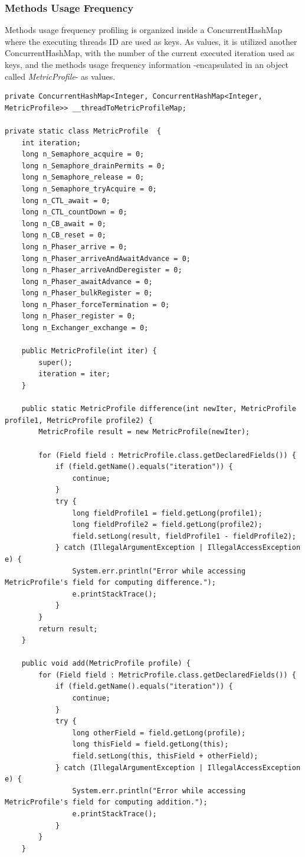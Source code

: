 \documentclass[]{usiinfthesis}
\begin{document}
\subsubsection{Methods Usage Frequency}
 Methods usage frequency profiling is organized inside a ConcurrentHashMap where the executing threads ID are used as keys. As values, it is utilized another ConcurrentHashMap, with the number of the current executed iteration used as keys, and the methods usage frequency information -encapsulated in an object called \textit{MetricProfile}- as values.
    \vspace*{0.25cm}
        \begin{verbatim}
private ConcurrentHashMap<Integer, ConcurrentHashMap<Integer, MetricProfile>> __threadToMetricProfileMap;

private static class MetricProfile  {
    int iteration;
    long n_Semaphore_acquire = 0;
    long n_Semaphore_drainPermits = 0;
    long n_Semaphore_release = 0;
    long n_Semaphore_tryAcquire = 0;
    long n_CTL_await = 0;
    long n_CTL_countDown = 0;
    long n_CB_await = 0;
    long n_CB_reset = 0;
    long n_Phaser_arrive = 0;
    long n_Phaser_arriveAndAwaitAdvance = 0;
    long n_Phaser_arriveAndDeregister = 0;
    long n_Phaser_awaitAdvance = 0;
    long n_Phaser_bulkRegister = 0;
    long n_Phaser_forceTermination = 0;
    long n_Phaser_register = 0;
    long n_Exchanger_exchange = 0;

    public MetricProfile(int iter) {
        super();
        iteration = iter;
    }

    public static MetricProfile difference(int newIter, MetricProfile profile1, MetricProfile profile2) {
        MetricProfile result = new MetricProfile(newIter);

        for (Field field : MetricProfile.class.getDeclaredFields()) {
            if (field.getName().equals("iteration")) {
                continue;
            }
            try {
                long fieldProfile1 = field.getLong(profile1);
                long fieldProfile2 = field.getLong(profile2);
                field.setLong(result, fieldProfile1 - fieldProfile2);
            } catch (IllegalArgumentException | IllegalAccessException e) {
                System.err.println("Error while accessing MetricProfile's field for computing difference.");
                e.printStackTrace();
            }
        }
        return result;
    }

    public void add(MetricProfile profile) {
        for (Field field : MetricProfile.class.getDeclaredFields()) {
            if (field.getName().equals("iteration")) {
                continue;
            }
            try {
                long otherField = field.getLong(profile);
                long thisField = field.getLong(this);
                field.setLong(this, thisField + otherField);
            } catch (IllegalArgumentException | IllegalAccessException e) {
                System.err.println("Error while accessing MetricProfile's field for computing addition.");
                e.printStackTrace();
            }
        }
    }


\end{verbatim}
\end{document}
